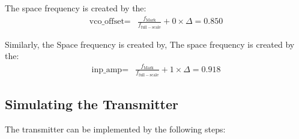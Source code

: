 \documentclass[11pt]{article}
\begin{document}
The space frequency is created by the:
\begin{align*}
  \text{vco\_offset} {}= & \frac{f_{\mathrm{Mark}}}{f_{\mathrm{full-scale}}} + 0 \times \Delta = \num{0.850}
\end{align*}

Similarly, the Space frequency is created by,
The space frequency is created by the:
\begin{align*}
  \text{inp\_amp} {}= & \frac{f_{\mathrm{Mark}}}{f_{\mathrm{full-scale}}} + 1 \times \Delta = \num{0.918}
\end{align*}

\subsection{Simulating the Transmitter}

The transmitter can be implemented by the following steps:
\end{document}
